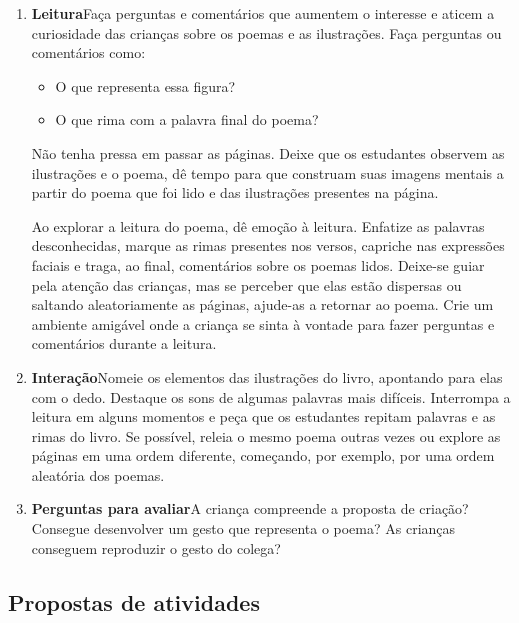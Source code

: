 \documentclass[11pt]{extarticle}
\begin{document}
\begin{enumerate}
\item \textbf{Leitura}\quad Faça perguntas e comentários que aumentem o 
interesse e aticem a curiosidade das crianças sobre os poemas e as ilustrações. Faça 
perguntas ou comentários como: 

\begin{itemize}
\item O que representa essa figura?
\item O que rima com a palavra final do poema?
\end{itemize}

Não tenha pressa em passar as páginas. Deixe que os estudantes 
observem as ilustrações e o poema, dê tempo para que construam suas imagens 
mentais a partir do poema que foi lido e das ilustrações presentes na página. 

Ao explorar a leitura do poema, dê emoção 
à leitura. Enfatize as palavras desconhecidas, marque as rimas presentes nos versos,
capriche nas expressões faciais e traga, ao final, comentários sobre os poemas lidos.
Deixe-se guiar pela atenção das crianças, mas se perceber que 
elas estão dispersas ou saltando aleatoriamente as páginas, ajude-as 
a retornar ao poema. Crie um ambiente amigável onde a criança 
se sinta à vontade para fazer perguntas e comentários durante a leitura.



\item \textbf{Interação}\quad Nomeie os elementos das ilustrações 
do livro, apontando para elas com o dedo. Destaque os sons de algumas 
palavras mais difíceis. Interrompa a leitura em alguns momentos e peça que 
os estudantes repitam palavras e as rimas do livro. Se possível, 
releia o mesmo poema outras vezes ou explore as páginas em uma ordem 
diferente, começando, por exemplo, por uma ordem aleatória dos poemas.

\item \textbf{Perguntas para avaliar}\quad A criança compreende a proposta de criação? Consegue desenvolver um gesto que representa o poema? As crianças conseguem reproduzir o gesto do colega? 

\end{enumerate}


\subsection{Propostas de atividades}
\end{document}
